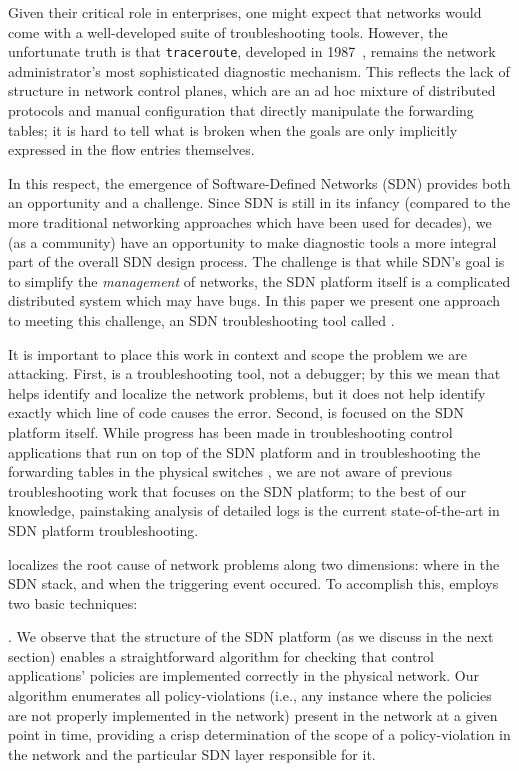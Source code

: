 Given their critical role in enterprises, one might expect that networks
would come with a well-developed suite of troubleshooting tools. However,
the unfortunate truth is that {\tt traceroute}, developed in 1987~\cite{traceroute},
remains the network administrator's most sophisticated diagnostic mechanism. This reflects
the lack of structure in network control planes, which are an ad hoc mixture of
distributed protocols and manual configuration that directly manipulate the forwarding tables; it is hard to tell what is broken
when the goals are only implicitly expressed in the flow entries themselves.

In this respect, the emergence of Software-Defined
Networks (SDN) provides both an opportunity and a challenge. Since SDN
is still in its infancy (compared to the more traditional networking approaches which have been
used for decades), we (as a community) have an opportunity to make diagnostic tools
a more integral part of the overall SDN design process. The challenge is that while SDN's goal is to simplify the
{\em management} of networks, the SDN platform itself is a complicated distributed system which may have bugs.
In this paper we present one approach to meeting this challenge, an SDN troubleshooting tool called \projectname{}.

It is important to place this work in context and scope the problem we are attacking.  First, \projectname{} is a troubleshooting tool, not a debugger; by this we mean that \projectname{} helps identify and localize the network problems, but it does not help  identify exactly which line of code causes the error. Second, \projectname{} is focused on the SDN platform itself. While progress has been made in troubleshooting control
applications that run on top of the SDN platform \cite{nice} and in troubleshooting the forwarding tables in the physical switches \cite{anteater,hsa}, we  
are not aware of previous troubleshooting work that focuses on the SDN platform; to the best of our knowledge, painstaking analysis of detailed logs is the current state-of-the-art in SDN platform troubleshooting. 


\projectname{} localizes the root cause
of network problems along two dimensions: where in the SDN stack, and when the triggering event occured. To accomplish this, 
\projectname{} employs two basic techniques:

. We observe that the structure of the
SDN platform (as we discuss in the next section) enables a straightforward algorithm for
checking that control applications' policies are implemented correctly in
the physical network. Our algorithm enumerates all policy-violations (i.e., any instance where the policies are not properly implemented in the network) present in the network at a given point in
time, providing a crisp determination of the scope of a policy-violation in the
network and the particular SDN layer responsible 
for it.

